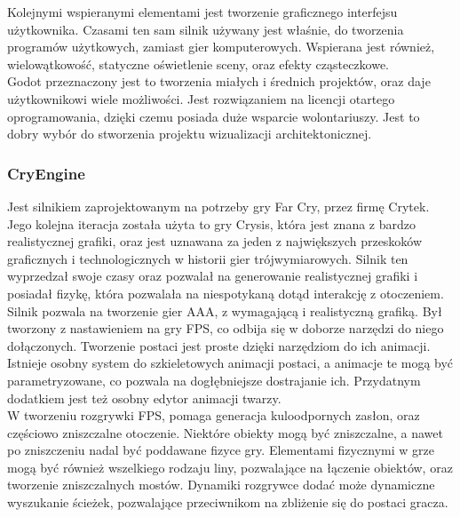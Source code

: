\documentclass{article} %
\begin{document}
        Kolejnymi wspieranymi elementami jest tworzenie graficznego interfejsu użytkownika. Czasami ten sam silnik używany jest właśnie, do tworzenia programów użytkowych, zamiast gier komputerowych. Wspierana jest również, wielowątkowość, statyczne oświetlenie sceny, oraz efekty cząsteczkowe.
        \\
        
        Godot przeznaczony jest to tworzenia miałych i średnich projektów, oraz daje użytkownikowi wiele możliwości. Jest rozwiązaniem na licencji otartego oprogramowania, dzięki czemu posiada duże wsparcie wolontariuszy. Jest to dobry wybór do stworzenia projektu wizualizacji architektonicznej.
        \\
        
        \subsubsection*{CryEngine}
        Jest silnikiem zaprojektowanym na potrzeby gry Far Cry, przez firmę Crytek. Jego kolejna iteracja została użyta to gry Crysis, która jest znana z bardzo realistycznej grafiki, oraz jest uznawana za jeden z największych przeskoków graficznych i technologicznych w historii gier trójwymiarowych. Silnik ten wyprzedzał swoje czasy oraz pozwalał na generowanie realistycznej grafiki i posiadał fizykę, która pozwalała na niespotykaną dotąd interakcję z otoczeniem. 
        \\
        
        Silnik pozwala na tworzenie gier AAA, z wymagającą i realistyczną grafiką. Był tworzony z nastawieniem na gry FPS, co odbija się w doborze narzędzi do niego dołączonych. Tworzenie postaci jest proste dzięki narzędziom do ich animacji. Istnieje osobny system do szkieletowych animacji postaci, a animacje te mogą być parametryzowane, co pozwala na dogłębniejsze dostrajanie ich. Przydatnym dodatkiem jest też osobny edytor animacji twarzy.
        \\
        
        W tworzeniu rozgrywki FPS, pomaga generacja kuloodpornych zasłon, oraz częściowo zniszczalne otoczenie. Niektóre obiekty mogą być zniszczalne, a nawet po zniszczeniu nadal być poddawane fizyce gry. Elementami fizycznymi w grze mogą być również wszelkiego rodzaju liny, pozwalające na łączenie obiektów, oraz tworzenie zniszczalnych mostów. Dynamiki rozgrywce dodać może dynamiczne wyszukanie ścieżek, pozwalające przeciwnikom na zbliżenie się do postaci gracza.
        \\
        
\end{document}
